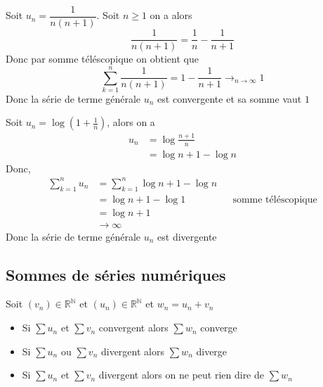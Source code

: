 \documentclass[11pt,colorlinks]{book}
\theoremstyle{mytheoremstyle}
\theoremstyle{mytheoremstyle}
\theoremstyle{mytheoremstyle}
\theoremstyle{mytheoremstyle}
\theoremstyle{mytheoremstyle}
\theoremstyle{mytheoremstyle}
\theoremstyle{mytheoremstyle}
\theoremstyle{mytheoremstyle}
\theoremstyle{myproblemstyle}
\def\mbb#1{\mathbb{#1}}
\def\bN{\mbb{N}}
\def\bR{\mbb{R}}
\def\rN{\bR^{\bN}}
\begin{document}
\begin{ex}
  Soit $u_n = \dfrac{1}{n(n+1)}$. Soit $n \geq 1$ on a alors
  \begin{equation*}
    \dfrac{1}{n(n+1)} = \dfrac{1}{n} - \dfrac{1}{n+1}
  \end{equation*}
  Donc par somme téléscopique on obtient que 
  \begin{equation*}
    \sum_{k=1}^{n} \dfrac{1}{n(n+1)} = 1 - \dfrac{1}{n+1} \to_{n \to \infty} 1 
  \end{equation*}
  Donc la série de terme générale $u_n$ est convergente et sa somme vaut $1$
\end{ex}
\begin{ex}
  Soit $u_n = \log \left(1 + \frac{1}{n}\right)$, alors on a 
  \begin{align*}
    u_n &= \log \frac{n+1}{n} \\ 
        &= \log n+1 - \log n
  \end{align*}
  Donc,
  \begin{align*}
    \sum_{k=1}^{n} u_n &= \sum_{k=1}^n \log n+1 - \log n \\
                       &= \log n+1 - \log 1 && \text{somme téléscopique} \\ 
                       &= \log n+1 \\
                       &\to \infty
  \end{align*}
  Donc la série de terme générale $u_n$ est divergente
\end{ex}
\subsection{Sommes de séries numériques}
\begin{prop}[Somme]
  Soit $(v_n) \in \rN$ et $(u_n) \in \rN$ et $w_n = u_n + v_n$ 
  \begin{itemize}
    \item Si $\sum u_n$ et $\sum v_n$ convergent alors $\sum w_n$ converge
    \item Si $\sum u_n$ ou $\sum v_n$ divergent alors $\sum w_n$ diverge
    \item Si $\sum u_n$ et $\sum v_n$ divergent alors on ne peut rien dire de $\sum w_n$
  \end{itemize}
\end{prop}
\end{document}
